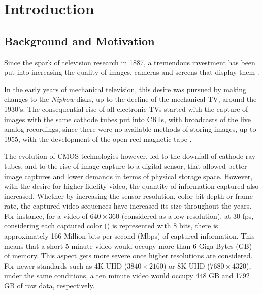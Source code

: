 \cleardoublepage
{}
\chapter{Introduction}

\section{Background and Motivation}


Since the spark of television research in 1887, a tremendous investment has been put into increasing the quality of images, cameras and screens that display them \cite{schubinWhatSparkedVideo2017}.

In the early years of mechanical television, this desire was pursued by making changes to the \textit{Nipkow} disks, up to the decline of the mechanical TV, around the 1930's. The consequential rise of all-electronic TVs started with the capture of images with the same cathode tubes put into \glspl{CRT}, with broadcasts of the live analog recordings, since there were no available methods of storing images, up to 1955, with the development of the open-reel magnetic tape \cite{jacobsBriefHistoryVideo}.

The evolution of \Gls{CMOS} technologies however, led to the downfall of cathode ray tubes, and to the rise of image capture to a digital sensor, that allowed better image captures and lower demands in terms of physical storage space. However, with the desire for higher fidelity video, the quantity of information captured also increased. Whether by increasing the sensor resolution, color bit depth or frame rate, the captured video sequences have increased its size throughout the years. For instance, for a video of $640 \times 360$ (considered as a low resolution), at 30 \gls{fps}, considering each captured color () is represented with 8 bits, there is approximately 166 Million bits per second (Mbps) of captured information. This means that a short 5 minute video would occupy more than 6 Giga Bytes (GB) of memory. This aspect gets more severe once higher resolutions are considered. For newer standards such as 4K \Gls{UHD} ($3840 \times 2160$) or 8K UHD ($ 7680 \times 4320$), under the same conditions, a ten minute video would occupy 448 GB and 1792 GB of raw data, respectively.

